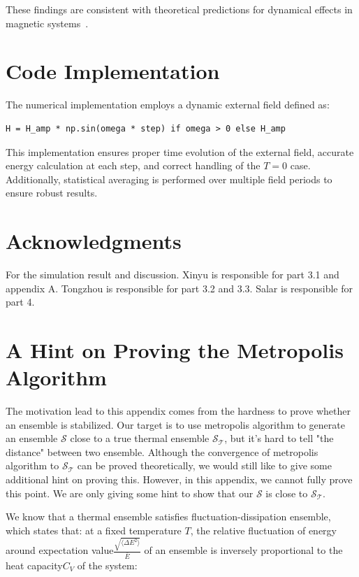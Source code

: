 \documentclass[11pt]{article}
\begin{document}
These findings are consistent with theoretical predictions for dynamical effects in magnetic systems~\cite{Chakrabarti1999, Sides1998}.

\section{Code Implementation}

The numerical implementation employs a dynamic external field defined as:

\begin{verbatim}
H = H_amp * np.sin(omega * step) if omega > 0 else H_amp
\end{verbatim}

This implementation ensures proper time evolution of the external field, accurate energy calculation at each step, and correct handling of the $T=0$ case. Additionally, statistical averaging is performed over multiple field periods to ensure robust results.

\section{Acknowledgments}

For the simulation result and discussion. Xinyu is responsible for part 3.1 and appendix A. Tongzhou is responsible for part 3.2 and 3.3. Salar is responsible for part 4.






\appendix
\section{A Hint on Proving the Metropolis Algorithm}\label{appendix}

The motivation lead to this appendix comes from the hardness to prove whether an ensemble is stabilized. Our target is to use metropolis algorithm to generate an ensemble $\mathcal{S}$ close to a true thermal ensemble $\mathcal{S_T}$, but it's hard to tell "the distance" between two ensemble. Although the convergence of metropolis algorithm to $\mathcal{S_T}$ can be proved theoretically, we would still like to give some additional hint on proving this. However, in this appendix, we cannot fully prove this point. We are only giving some hint to show that our $\mathcal{S}$ is close to $\mathcal{S_T}$.

We know that a thermal ensemble satisfies fluctuation-dissipation ensemble, which states that: at a fixed temperature $T$, the relative fluctuation of energy around expectation value$\frac{\sqrt{\langle \Delta E^2\rangle}}{\bar E}$ of an ensemble is inversely proportional to the heat capacity$C_V$ of the system:
\end{document}
